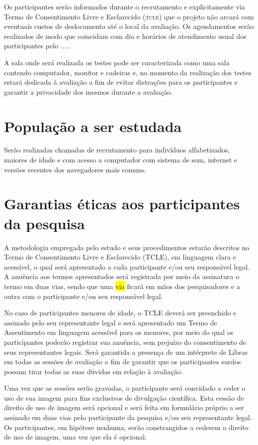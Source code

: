 \documentclass[a4paper,11pt,titlepage,singlespacing]{article}
\begin{document}
Os participantes serão informados durante o recrutamento e explicitamente via Termo de Consentimento Livre e Esclarecido (\textsc{tcle}) que o projeto não arcará com eventuais custos de deslocamento até o local da avaliação. Os agendamentos serão realizados de modo que coincidam com dia e horários de atendimento usual dos participantes pelo .....

A sala onde será realizada os testes pode ser caracterizada como uma sala contendo computador, monitor e cadeiras e, no momento da realização dos testes estará dedicada à avaliação a fim de evitar distrações para os participantes e garantir a privacidade dos mesmos durante a avaliação.

\section{População a ser estudada}

\noindent Serão realizadas chamadas de recrutamento para indivíduos alfabetizados, maiores de idade e com acesso a computador com sistema de som, internet e versões recentes dos navegadores mais comuns.

\section{Garantias éticas aos participantes da pesquisa}
A metodologia empregada pelo estudo e seus procedimentos estarão descritos no Termo de Consentimento Livre e Esclarecido (TCLE), em linguagem clara e acessível, o qual será apresentado a cada participante e/ou seu responsável legal. A anuência aos termos apresentados será registrada por meio da assinatura o termo em duas vias, sendo que uma \colorbox{yellow}{via}
ficará em mãos dos pesquisadores e a outra com o participante e/ou seu responsável legal.

No caso de participantes menores de idade, o TCLE deverá ser preenchido e assinado pelo seu representante legal e será apresentado um Termo de Assentimento em linguagem acessível para os menores, por meio do qual os participantes poderão registrar sua anuência, sem prejuízo do consentimento de seus representantes legais.
Será garantida a presença de um intérprete de Libras em todas as sessões de avaliação a fim de garantir que os participantes surdos possam tirar todas as suas dúvidas em relação à avaliação.

Uma vez que as sessões serão gravadas, o participante será convidado a ceder o uso de sua imagem para fins exclusivos de divulgação científica. Esta cessão de direito de uso de imagem será opcional e será feita em formulário próprio a ser assinado em duas vias pelo participante da pesquisa e/ou seu representante legal. Os participantes, em hipótese nenhuma, serão constrangidos a cederem o direito de uso de imagem, uma vez que ela é opcional.
\end{document}
